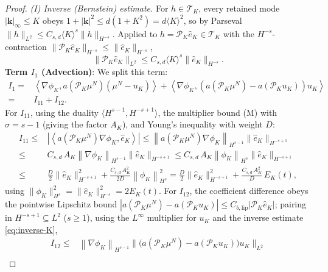 \documentclass[a4paper,fleqn]{cas-sc}
\theoremstyle{definition}
\theoremstyle{remark}
\begin{document}
\begin{proof}
\emph{(I) Inverse (Bernstein) estimate.} For $h\in\mathcal T_K$, every retained mode
$|\mathbf k|_\infty\le K$ obeys $1+|\mathbf k|^2\le d(1+K^2)=d\langle K\rangle^2$, so by
Parseval $\|h\|_{L^2}\le C_{s,d}\langle K\rangle^{s}\|h\|_{H^{-s}}$. Applied to
$h=\mathcal P_K\hat e_K\in\mathcal T_K$ with the $H^{-s}$-contraction
$\|\mathcal P_K\hat e_K\|_{H^{-s}}\le\|\hat e_K\|_{H^{-s}}$,
\begin{equation}\label{eq:inverse-K}
\|\mathcal P_K\hat e_K\|_{L^2}\le C_{s,d}\langle K\rangle^{s}\|\hat e_K\|_{H^{-s}}.
\end{equation}
\textbf{Term $I_1$ (Advection)}: We split this term: 
\begin{equation}
    \begin{aligned}
        I_1 
        = &  
         \left\langle \nabla  \phi_K,  a(\mathcal P_K \mu^N ) ( \mu^N - u_K )\right\rangle 
        +
        \left\langle \nabla  \phi_K,  \left( a(\mathcal P_K \mu^N) - a(\mathcal P_K u_K) \right) u_K \right\rangle \\
        =& I_{11} + I_{12}.
    \end{aligned}
\end{equation}
For $I_{11}$, using the duality $\langle H^{s-1}, H^{-s+1}\rangle$, the multiplier
bound (M) with $\sigma=s-1$ (giving the factor $A_K$), and Young's inequality with
weight $D$:
\[
\begin{aligned}
    I_{11}
        \leq &
        \left|\left\langle a(\mathcal P_K \mu^N)  \nabla  \phi_K,   \hat e_K\right\rangle\right|
        \leq \left\|a(\mathcal P_K \mu^N)  \nabla  \phi_K\right\|_{H^{s-1}} \|\hat e_K\|_{H^{-s+1}} \\
        \leq& C_{s,d}\,A_K \left\|\nabla  \phi_K\right\|_{H^{s-1}} \|\hat e_K\|_{H^{-s+1}}
        \leq C_{s,d}\,A_K \left\|  \phi_K\right\|_{H^{s}} \|\hat e_K\|_{H^{-s+1}} \\
        \leq& \frac{D}{2}\|\hat{e}_K\|^2_{H^{-s+1}} + \frac{C_{s,d}\,A_K^2}{2D}\left\|  \phi_K\right\|_{H^{s}}^2
        = \frac{D}{2}\|\hat{e}_K\|^2_{H^{-s+1}} + \frac{C_{s,d}\,A_K^2}{D}\, E_K(t),
\end{aligned}
\]
using $\|\phi_K\|_{H^s}^2=\|\hat e_K\|_{H^{-s}}^2=2E_K(t)$.
For $I_{12}$, the coefficient difference obeys the pointwise Lipschitz bound
$|a(\mathcal P_K\mu^N)-a(\mathcal P_Ku_K)|\le C_{b,\mathrm{lip}}|\mathcal P_K\hat e_K|$; pairing
in $H^{-s+1}\subseteq L^2$ ($s\ge1$), using the $L^\infty$ multiplier for $u_K$ and the
inverse estimate \eqref{eq:inverse-K},
\[
\begin{aligned}
     I_{12} \leq & \left\|\nabla \phi_K\right\|_{H^{s-1}} \bigl\| \bigl(a(\mathcal P_K \mu^N) - a(\mathcal P_K u_K)\bigr)u_K\bigr\|_{L^2}\\

\end{aligned}\]
\end{proof}
\end{document}
